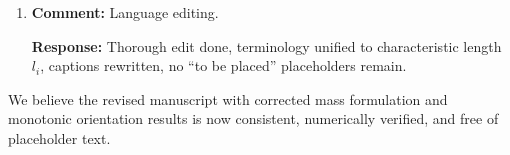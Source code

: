 \documentclass[12pt,a4paper]{article}
\begin{document}
\begin{enumerate}[leftmargin=14pt, itemsep=10pt]
\textbf{Response:} $4\times2\times2$ 45 nodes 1080 DOF, $u_{avg}=4.7876$ $\mu$m, $f_{iso}=178.72$ Hz $>171.61$ Hz classical, $\kappa=3.27\times10^5$, reaction error $<10^{-11}$. Full sensitivity: $2\times1\times1$ $u=4.5665$ $\mu$m $f_1=193.00$ Hz, $4\times2\times2$ $u=4.7876$ $\mu$m $f_1=178.72$ Hz, $6\times3\times3$ $u=4.8371$ $\mu$m $f_1=174.96$ Hz ($5.9\%$ displacement, $9.3\%$ frequency variation coarsest vs finest) from \texttt{mesh\_sensitivity\_3D.m}.

\item \textbf{Comment:} Language editing.

\textbf{Response:} Thorough edit done, terminology unified to characteristic length $l_i$, captions rewritten, no ``to be placed'' placeholders remain.

\end{enumerate}

We believe the revised manuscript with corrected mass formulation and monotonic orientation results is now consistent, numerically verified, and free of placeholder text.
\end{document}
